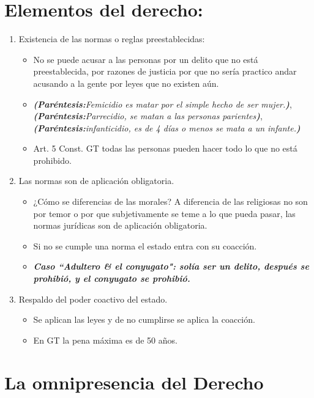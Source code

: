 \section{Elementos del derecho:}
\begin{enumerate}
    \item Existencia de las normas o reglas preestablecidas:
    \begin{itemize}
        \item No se puede acusar a las personas por un delito que no está preestablecida, por razones de justicia por que no sería practico andar acusando a la gente por leyes que no existen aún.
        \item \emph{\textbf{(Paréntesis:}Femicidio es matar por el simple hecho de ser mujer.\textbf{)}}, \emph{\textbf{(Paréntesis:}Parrecidio, se matan a las personas parientes\textbf{)}}, \emph{\textbf{(Paréntesis:}infanticidio, es de 4 días o menos se mata a un infante.\textbf{)}}
        \item Art. 5 Const. GT todas las personas pueden hacer todo lo que no está prohibido.
    \end{itemize}

    \item Las normas son de aplicación obligatoria.
    \begin{itemize}
        \item ¿Cómo se diferencias de las morales? A diferencia de las religiosas no son por temor o por que subjetivamente se teme a lo que pueda pasar, las normas jurídicas son de aplicación obligatoria.
        \item Si no se cumple una norma el estado entra con su coacción.
        \item \textbf{\emph{Caso ``Adultero \& el conyugato": solía ser un delito, después se prohibió, y el conyugato se prohibió.}}
    \end{itemize}
    
    \item Respaldo del poder coactivo del estado.
    \begin{itemize}
        \item Se aplican las leyes y de no cumplirse se aplica la coacción.
        \item En GT la pena máxima es de 50 años.
    \end{itemize}
\end{enumerate}

\section{}

\section{La omnipresencia del Derecho}
